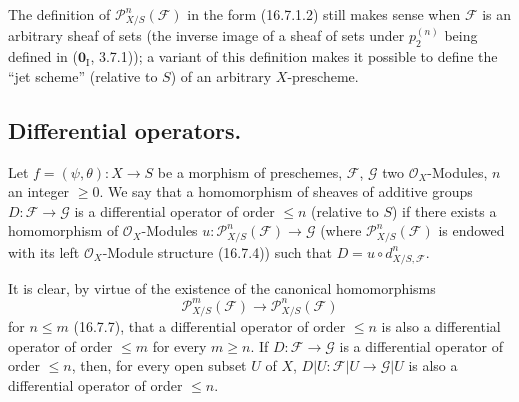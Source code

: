 \begin{remark}[16.7.10]
\label{IV.16.7.10}
The definition of $\mathscr{P}_{X/S}^n(\mathscr{F})$ in the form (16.7.1.2)
still makes sense when $\mathscr{F}$ is an arbitrary sheaf of sets
(the inverse image of a sheaf of sets under $p_2^{(n)}$ being defined
in ($\mathbf{0}_{\mathrm I}$, 3.7.1)); a variant of this definition makes it
possible to define the ``jet scheme'' (relative to $S$) of an arbitrary
$X$-prescheme.
\end{remark}

\subsection{Differential operators\texorpdfstring{\protect\footnotemark}{}.}

\begin{definition}[16.8.1]\label{IV.16.8.1}
Let $f=(\psi,\theta):X\to S$ be a morphism of preschemes,
$\mathscr{F}$, $\mathscr{G}$ two $\mathcal{O}_X$-Modules, $n$ an integer
$\geq0$. We say that a homomorphism of sheaves of additive groups
$D:\mathscr{F}\to\mathscr{G}$ is a differential operator of order
$\leq n$ (relative to $S$) if there exists a homomorphism of
$\mathcal{O}_X$-Modules
$u:\mathscr{P}_{X/S}^n(\mathscr{F})\to\mathscr{G}$ (where
$\mathscr{P}_{X/S}^n(\mathscr{F})$ is endowed with its left
$\mathcal{O}_X$-Module structure \textup{(16.7.4)}) such that
$D=u\circ d_{X/S,\mathscr{F}}^n$.
\end{definition}

It is clear, by virtue of the existence of the canonical homomorphisms
\[
  \mathscr{P}_{X/S}^m(\mathscr{F})
  \longrightarrow\mathscr{P}_{X/S}^n(\mathscr{F})
\]
for $n\leq m$ (16.7.7), that a differential operator of order $\leq n$ is
also a differential operator of order $\leq m$ for every $m\geq n$. If
$D:\mathscr{F}\to\mathscr{G}$ is a differential operator of order
$\leq n$, then, for every open subset $U$ of $X$,
$D|U:\mathscr{F}|U\to\mathscr{G}|U$ is also a differential operator
of order $\leq n$.

